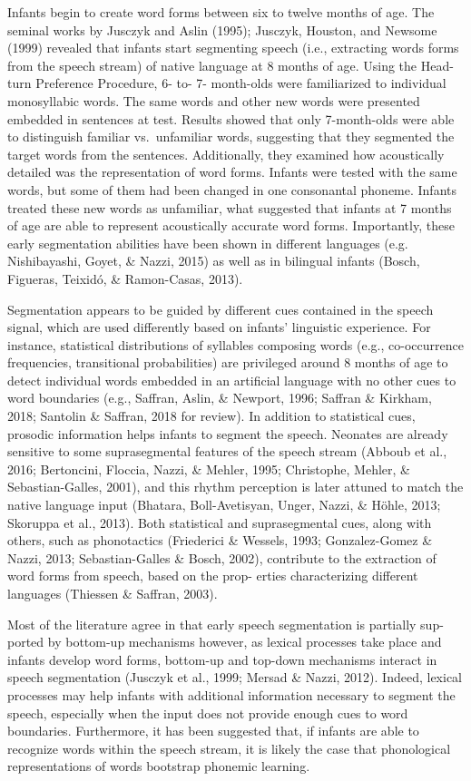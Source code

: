 \documentclass[man,floatsintext]{apa6}
\begin{document}
Infants begin to create word forms between six to twelve months of age. The seminal works by Jusczyk and Aslin (1995); Jusczyk, Houston, and Newsome (1999) revealed that infants start segmenting speech (i.e., extracting words forms from the speech stream) of native language at 8 months of age. Using the Head-turn Preference Procedure, 6- to- 7- month-olds were familiarized to individual monosyllabic words. The same words and other new words were presented embedded in sentences at test. Results showed that only 7-month-olds were able to distinguish familiar vs.~unfamiliar words, suggesting that they segmented the target words from the sentences. Additionally, they examined how acoustically detailed was the representation of word forms. Infants were tested with the same words, but some of them had been changed in one consonantal phoneme. Infants treated these new words as unfamiliar, what suggested that infants at 7 months of age are able to represent acoustically accurate word forms. Importantly, these early segmentation abilities have been shown in different languages (e.g. Nishibayashi, Goyet, \& Nazzi, 2015) as well as in bilingual infants (Bosch, Figueras, Teixidó, \& Ramon-Casas, 2013).

Segmentation appears to be guided by different cues contained in the speech signal, which are used differently based on infants' linguistic experience. For instance, statistical distributions of syllables composing words (e.g., co-occurrence frequencies, transitional probabilities) are privileged around 8 months of age to detect individual words embedded in an artificial language with no other cues to word boundaries (e.g., Saffran, Aslin, \& Newport, 1996; Saffran \& Kirkham, 2018; Santolin \& Saffran, 2018 for review). In addition to statistical cues, prosodic information helps infants to segment the speech. Neonates are already sensitive to some suprasegmental features of the speech stream (Abboub et al., 2016; Bertoncini, Floccia, Nazzi, \& Mehler, 1995; Christophe, Mehler, \& Sebastian-Galles, 2001), and this rhythm perception is later attuned to match the native language input (Bhatara, Boll-Avetisyan, Unger, Nazzi, \& Höhle, 2013; Skoruppa et al., 2013). Both statistical and suprasegmental cues, along with others, such as phonotactics (Friederici \& Wessels, 1993; Gonzalez-Gomez \& Nazzi, 2013; Sebastian-Galles \& Bosch, 2002), contribute to the extraction of word forms from speech, based on the prop- erties characterizing different languages (Thiessen \& Saffran, 2003).

Most of the literature agree in that early speech segmentation is partially sup- ported by bottom-up mechanisms however, as lexical processes take place and infants develop word forms, bottom-up and top-down mechanisms interact in speech segmentation (Jusczyk et al., 1999; Mersad \& Nazzi, 2012). Indeed, lexical processes may help infants with additional information necessary to segment the speech, especially when the input does not provide enough cues to word boundaries. Furthermore, it has been suggested that, if infants are able to recognize words within the speech stream, it is likely the case that phonological representations of words bootstrap phonemic learning.
\end{document}
